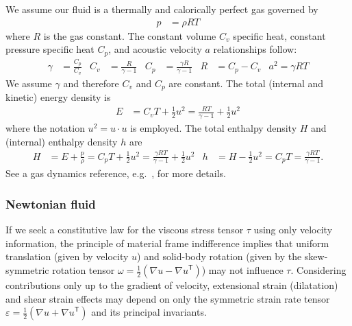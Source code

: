 \documentclass[letterpaper,11pt,nointlimits,reqno,draft]{amsart}
\newcommand{\trans}[1]{{#1}^{\ensuremath{\mathsf{T}}}}
\begin{document}
We assume our fluid is a thermally and calorically perfect gas governed by
\begin{align}
  \label{eq:perfectgaseos}
  p &= \rho{} R T
\end{align}
where $R$ is the gas constant. The constant volume $C_{v}$ specific heat,
constant pressure specific heat $C_{p}$, and acoustic velocity $a$
relationships follow:
\begin{align}
  \label{eq:perfectgasrelations}
  \gamma &= \frac{C_{p}}{C_{v}}
  &
  C_{v} &= \frac{R}{\gamma - 1}
  &
  C_{p} &= \frac{\gamma{}R}{\gamma-1}
  &
  R &= C_{p} - C_{v}
  &
  a^{2} = \gamma{}RT
\end{align}
We assume $\gamma$ and therefore $C_{v}$ and $C_{p}$ are constant.
The total (internal and kinetic) energy density is
\begin{align}
  \label{eq:perfectgastotalenergy}
  E &= C_{v} T + \frac{1}{2}u^{2}
     = \frac{RT}{\gamma-1} + \frac{1}{2}u^{2}
\end{align}
where the notation $u^2 = u\cdot{}u$ is employed.
The total enthalpy density $H$ and (internal) enthalpy density $h$ are
\begin{align}
  \label{eq:perfectgasenthalpy}
  H &= E + \frac{p}{\rho}
     = C_{p} T + \frac{1}{2}u^{2}
     = \frac{\gamma{}RT}{\gamma-1} + \frac{1}{2}u^{2}
  &
  h &= H - \frac{1}{2}u^{2}
     = C_{p} T
     = \frac{\gamma{}RT}{\gamma-1}
  .
\end{align}
See a gas dynamics reference, e.g.~\cite{LiepmannRoshko2002}, for more details.

\subsubsection{Newtonian fluid}
\label{sec:newtonianfluid}

If we seek a constitutive law for the viscous stress tensor $\tau$
using only velocity information, the principle of material frame
indifference implies that uniform translation (given by velocity $u$)
and solid-body rotation (given by the skew-symmetric rotation tensor
$\omega=\frac{1}{2}\left( \nabla{}u-\trans{\nabla{}u} \right)$)
may not influence $\tau$.  Considering contributions only up to the
gradient of velocity, extensional strain (dilatation) and shear strain
effects may depend on only the symmetric strain rate tensor
$\varepsilon=\frac{1}{2}\left( \nabla{}u+\trans{\nabla{}u}\right)$
and its principal invariants.
\end{document}
